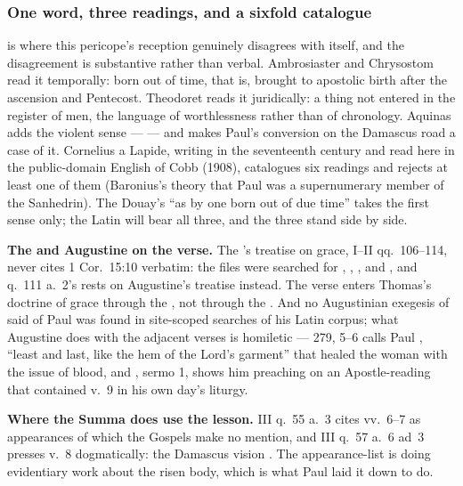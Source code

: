 \subsubsection*{One word, three readings, and a sixfold catalogue}

 is where this pericope's reception genuinely
disagrees with itself, and the disagreement is substantive rather than verbal.
Ambrosiaster and Chrysostom read it temporally: born out of time, that is,
brought to apostolic birth after the ascension and Pentecost. Theodoret reads
it juridically: a thing not entered in the register of men, the language of
worthlessness rather than of chronology. Aquinas adds the violent sense ---
 --- and makes Paul's conversion on the Damascus
road a case of it. Cornelius a Lapide, writing in the seventeenth century and
read here in the public-domain English of Cobb (1908), catalogues six readings
and rejects at least one of them (Baronius's theory that Paul was a
supernumerary member of the Sanhedrin). The Douay's ``as by one born out of due
time'' takes the first sense only; the Latin will bear all three, and the
three stand side by side.

\textbf{The  and Augustine on the verse.} The 's treatise
on grace, I--II qq.~106--114, never cites 1 Cor.~15:10 verbatim: the files were
searched for , ,
, and , and q.~111 a.~2's 
rests on Augustine's treatise instead. The verse enters Thomas's doctrine of
grace through the , not through the . And no
Augustinian exegesis of  said of Paul was found in
site-scoped searches of his Latin corpus; what Augustine does with the
adjacent verses is homiletic ---  279, 5--6 calls Paul
, ``least and last, like the hem of the Lord's garment'' that
healed the woman with the issue of blood, and , sermo
1, shows him preaching on an Apostle-reading that contained v.~9 in his own
day's liturgy.

\textbf{Where the Summa does use the lesson.}  III
q.~55 a.~3 cites vv.~6--7 as appearances of which the Gospels make no mention,
and III q.~57 a.~6 ad~3 presses v.~8 dogmatically: the Damascus vision
. The appearance-list is doing evidentiary work about the risen
body, which is what Paul laid it down to do.

